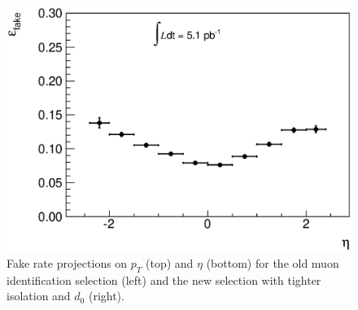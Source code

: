 \begin{figure}[!htbp]
\begin{center}
\includegraphics[scale=0.33]{figures/freta_new.eps}
\caption{Fake rate projections on $p_T$ (top) and $\eta$ (bottom) for the old muon identification selection (left) and the new selection with tighter isolation and $d_0$ (right).}
\label{fig:mufakerate0}
\end{center}
\end{figure}

